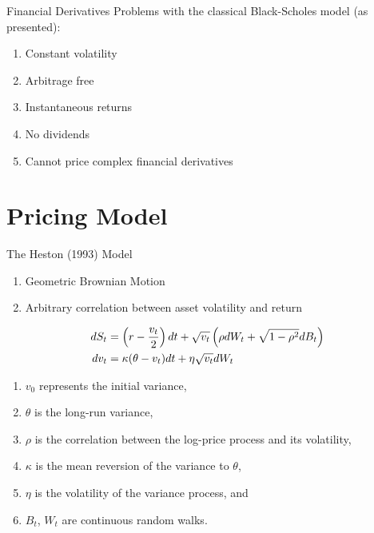\documentclass[aspectratio=169,xcolor=dvipsnames]{beamer}
\begin{document}
		\begin{frame}{Financial Derivatives}
			Problems with the classical Black-Scholes model (as presented):
			\begin{enumerate}
				\item{Constant volatility}
				\item{Arbitrage free}
				\item{Instantaneous returns}
				\item{No dividends}
				\item{Cannot price complex financial derivatives}
			\end{enumerate}
		\end{frame}
		
	\section{Pricing Model}
	
		\begin{frame}{The Heston (1993) Model}
			\begin{enumerate}
				\item Geometric Brownian Motion
				\item Arbitrary correlation between asset volatility and return
			\end{enumerate}
			\begin{align}
				dS_t &= \left( r - \frac{v_t}{2} \right) dt + \sqrt{v_t} \left( \rho dW_t + \sqrt{1 - \rho^2} dB_t \right) \label{eq:hdXt} \\
				dv_t &= \kappa (\theta - v_t) dt + \eta \sqrt{v_t} dW_t \hspace{1.8cm} \label{eq:hdvt}
			\end{align}
			\begin{enumerate}
				\item $v_0$ represents the initial variance,
				\item $\theta$ is the long-run variance,
				\item $\rho$ is the correlation between the log-price process and its volatility,
				\item $\kappa$ is the mean reversion of the variance to $\theta$,
				\item $\eta$ is the volatility of the variance process, and 
				\item $B_{t}$, $W_{t}$ are continuous random walks.
			\end{enumerate}
		\end{frame}
	
\end{document}

